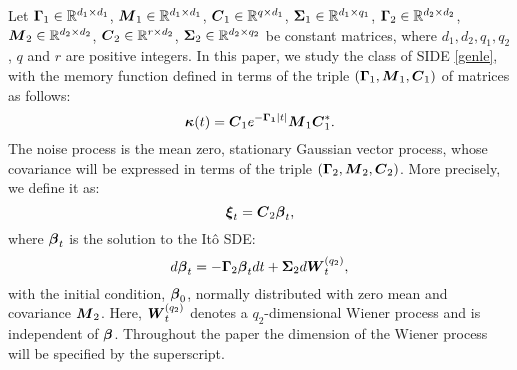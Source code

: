 Let $\boldsymbol{\Gamma}_1 \in \mathbb{R}^{d_1 \times d_1}$, $\boldsymbol{M}_1 \in \mathbb{R}^{d_1 \times d_1}$, $\boldsymbol{C}_1 \in \mathbb{R}^{q \times d_1}$, $\boldsymbol{\Sigma}_1 \in \mathbb{R}^{d_1 \times q_1}$, $\boldsymbol{\Gamma}_2 \in \mathbb{R}^{d_2 \times d_2}$, $\boldsymbol{M}_2 \in \mathbb{R}^{d_2 \times d_2}$, $\boldsymbol{C}_2 \in \mathbb{R}^{r \times d_2}$, $\boldsymbol{\Sigma}_2 \in \mathbb{R}^{d_2 \times q_2}$ be constant matrices, where $d_1,d_2,q_1,q_2$, $q$ and $r$ are positive integers. 
In this paper, we study the class of SIDE \eqref{genle}, with the memory function defined in terms of the triple $(\boldsymbol{\Gamma}_1,\boldsymbol{M}_1,\boldsymbol{C}_1)$ of matrices as follows:
\begin{equation} \label{memory_realized}
\boldsymbol{\kappa}(t)=\boldsymbol{C}_1e^{-\boldsymbol{\Gamma_1}|t|}\boldsymbol{M}_1\boldsymbol{C}_1^*.
\end{equation}
The noise process is the mean zero, stationary Gaussian vector process,  whose covariance will be expressed in terms of the triple $(\boldsymbol{\Gamma}_2,\boldsymbol{M}_2,\boldsymbol{C}_2)$.  More precisely, we define it as:
\begin{equation} \label{noise}
\boldsymbol{\xi}_t = \boldsymbol{C}_2 \boldsymbol{\beta}_t,\end{equation}
where $\boldsymbol{\beta}_t$ is the solution to the It\^o SDE:
\begin{equation} \label{realize}
d\boldsymbol{\beta}_t = -\boldsymbol{\Gamma}_2\boldsymbol{\beta}_t dt + \boldsymbol{\Sigma}_2 d\boldsymbol{W}^{(q_2)}_t,
\end{equation}
with the initial condition, $\boldsymbol{\beta}_0$, normally distributed with zero mean and covariance  $\boldsymbol{M}_2$. Here, $\boldsymbol{W}^{(q_2)}_t$ denotes a $q_2$-dimensional Wiener process and is independent of $\boldsymbol{\beta}$. Throughout the paper the dimension of the Wiener process will be specified by the superscript. 


